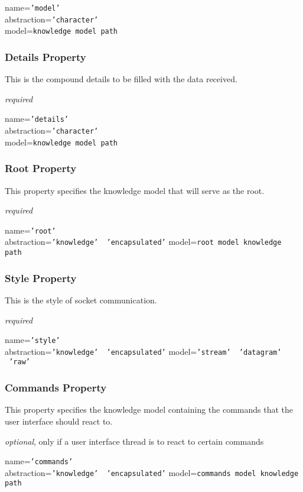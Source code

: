 name=\texttt{'model'}\\
abstraction=\texttt{'character'}\\
model=\texttt{knowledge model path}

\subsubsection{Details Property}

This is the compound details to be filled with the data received.

\emph{required}

name=\texttt{'details'}\\
abstraction=\texttt{'character'}\\
model=\texttt{knowledge model path}

\subsubsection{Root Property}

This property specifies the knowledge model that will serve as the root.

\emph{required}

name=\texttt{'root'}\\
abstraction=\texttt{'knowledge' \vline\ 'encapsulated'}
model=\texttt{root model knowledge path}

\subsubsection{Style Property}

This is the style of socket communication.

\emph{required}

name=\texttt{'style'}\\
abstraction=\texttt{'knowledge' \vline\ 'encapsulated'}
model=\texttt{'stream' \vline\ 'datagram' \vline\ 'raw'}

\subsubsection{Commands Property}

This property specifies the knowledge model containing the commands that the
user interface should react to.

\emph{optional}, only if a user interface thread is to react to certain commands

name=\texttt{'commands'}\\
abstraction=\texttt{'knowledge' \vline\ 'encapsulated'}
model=\texttt{commands model knowledge path}


